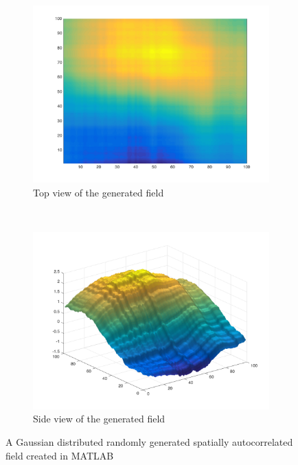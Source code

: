 \documentclass[11pt]{ucthesis}
\begin{document}
\begin{figure}[ht!]
    \centering
    \begin{subfigure}[t]{0.5\textwidth}
        \centering
        \includegraphics[width=\linewidth]{figures/generated_field_top_view.png}
        \captionsetup{skip=0.5\baselineskip,size=footnotesize}
        \caption{Top view of the generated field}
		\label{fig:top_view_field}
    \end{subfigure}%
    ~ 
    \begin{subfigure}[t]{0.5\textwidth}
        \centering
        \includegraphics[width=\linewidth]{figures/generated_field_side_view.png}
		\captionsetup{skip=0.5\baselineskip,size=footnotesize}
		\caption{Side view of the generated field}
		\label{fig:side_view_field}
    \end{subfigure}
    \captionsetup{skip=0.5\baselineskip,size=footnotesize}
    \caption{A Gaussian distributed randomly generated spatially autocorrelated field created in MATLAB}
    \label{fig:gen_field}
\end{figure}
\end{document}
